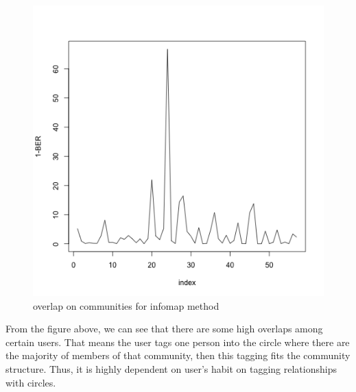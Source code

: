 \documentclass{article}
\begin{document}
\begin{figure}[htbp]
\centering
\includegraphics[width=.8\textwidth]{7_6.png}
\caption{overlap on communities for infomap method}
\label{fig:p7_3}
\end{figure}
\noindent From the figure above, we can see that there are some high overlaps among certain users. That means the user tags one person into the circle where there are the majority of members of that community, then this tagging fits the community structure. Thus, it is highly dependent on user's habit on tagging relationships with circles.
\end{document}
